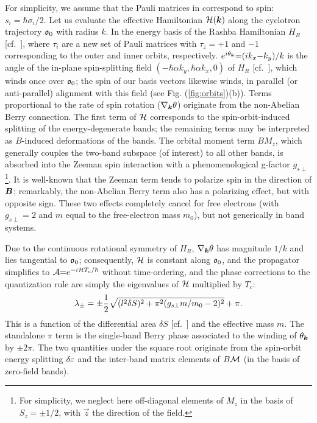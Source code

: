 \documentclass[aps, showpacs, twocolumn, notitlepage, superscriptaddress]{revtex4-1}
\begin{document}
For simplicity, we assume that the Pauli matrices in  correspond to spin: $s_i{=}\hbar \sigma_i/2$. Let us evaluate the effective Hamiltonian ${\cal H}(\boldsymbol{k})$ along the cyclotron trajectory $\mathfrak{o}_0$ with radius $k$. In the energy basis of the Rashba Hamiltonian $H_R$ [cf.\ ], 
where $\tau_i$ are a new set of Pauli matrices with $\tau_z{=}{+} 1$ and ${-}1$ corresponding to the outer and inner orbits, respectively. $e^{i\theta_{\boldsymbol{k}}}{=}(ik_x{-}k_y)/k$ is the angle of the in-plane spin-splitting field $(-\hbar\alpha k_y,\hbar\alpha k_x,0)$ of $H_R$ [cf.\ ], which winds once over $\mathfrak{o}_0$; the spin of our basis vectors likewise winds, in parallel (or anti-parallel) alignment with this field (see Fig. (\ref{fig:orbits})(b)). Terms proportional to the rate of spin rotation ($\nabla_{\boldsymbol{k}} \theta$) originate from the non-Abelian Berry connection. The first term of  ${\cal H}$ corresponds to the spin-orbit-induced splitting of the energy-degenerate bands;
the remaining terms may be interpreted as $B$-induced deformations of the bands. The orbital moment term $B M_z$, which generally couples the two-band subspace (of interest) to all other bands, is absorbed into the Zeeman spin interaction with a phenomenological g-factor $g_{s\perp}$\footnote{For simplicity, we neglect here off-diagonal elements of $M_z$ in the basis of $S_z=\pm 1/2$, with $\vec{z}$ the direction of the field.}. It is well-known that the Zeeman term tends to polarize spin in the direction of $\boldsymbol{B}$; remarkably, the non-Abelian Berry term  also has a polarizing effect, but with opposite sign. These two effects completely cancel for free electrons (with $g_{s\perp}=2$ and $m$ equal to the free-electron mass $m_0$), but not generically in band systems. 

Due to the continuous rotational symmetry of $H_R$, $\nabla_{\boldsymbol{k}} \theta$ has magnitude $1/k$ and lies tangential to $\mathfrak{o}_0$; consequently, ${\cal H}$ is constant along $\mathfrak{o}_0$, and the propagator simplifies to ${\cal A}{=}e^{{-}i{\cal H} T_c/\hbar}$ without time-ordering, and the phase corrections to the quantization rule are simply the eigenvalues of ${\cal H}$ multiplied by $T_c$:
\begin{equation}
\lambda_{\pm}=\pm\frac{1}{2}\sqrt{({l^2\delta S})^2+\pi^2(g_{s\perp}m/m_0-2)^2}+\pi. \label{eq:Rashba-lambda}
\end{equation}
This is a function of the differential area $\delta S$ [cf.\ ] and the effective mass $m$. The standalone $\pi$ term is the single-band Berry phase associated to the winding of $\theta_{\boldsymbol{k}}$ by ${\pm}2\pi$. The two quantities under the square root originate from the spin-orbit energy splitting $\delta \varepsilon$ and the inter-band matrix elements of $B{\cal M}$ (in the basis of zero-field bands). 
\end{document}
